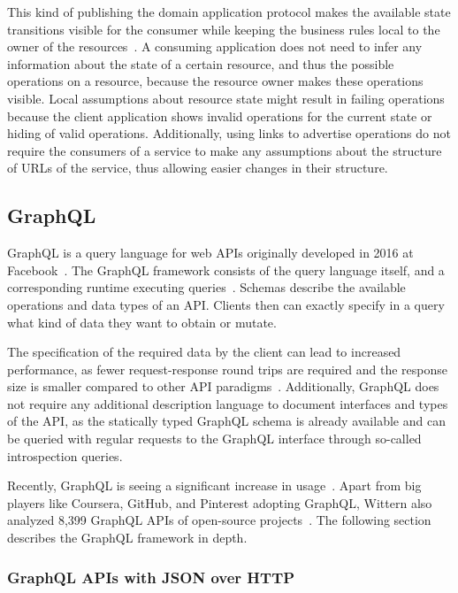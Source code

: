 This kind of publishing the domain application protocol makes the available state transitions visible for the consumer while keeping the business rules local to the owner of the resources~\cite{Webber2010}.
A consuming application does not need to infer any information about the state of a certain resource, and thus the possible operations on a resource, because the resource owner makes these operations visible.
Local assumptions about resource state might result in failing operations because the client application shows invalid operations for the current state or hiding of valid operations.
Additionally, using links to advertise operations do not require the consumers of a service to make any assumptions about the structure of \acp{URL} of the service, thus allowing easier changes in their structure.

\subsection{GraphQL}

GraphQL is a query language for web \acp{API} originally developed in 2016 at Facebook~\cite{Hartig2017}.
The GraphQL framework consists of the query language itself, and a corresponding runtime executing queries~\cite{Wittern2019}.
Schemas describe the available operations and data types of an \ac{API}.
Clients then can exactly specify in a query what kind of data they want to obtain or mutate.

The specification of the required data by the client can lead to increased performance, as fewer request-response round trips are required and the response size is smaller compared to other \ac{API} paradigms~\cite{Wittern2019}.
Additionally, GraphQL does not require any additional description language to document interfaces and types of the \ac{API}, as the statically typed GraphQL schema is already available and can be queried with regular requests to the GraphQL interface through so-called introspection queries.

Recently, GraphQL is seeing a significant increase in usage~\cite{Hartig2017}.
Apart from big players like Coursera, GitHub, and Pinterest adopting GraphQL, Wittern also analyzed 8,399 GraphQL \acp{API} of open-source projects~\cite{Wittern2019}.
The following section describes the GraphQL framework in depth.

\subsubsection{GraphQL \acp{API} with \ac{JSON} over \ac{HTTP}}\label{sec:graphql-http}

